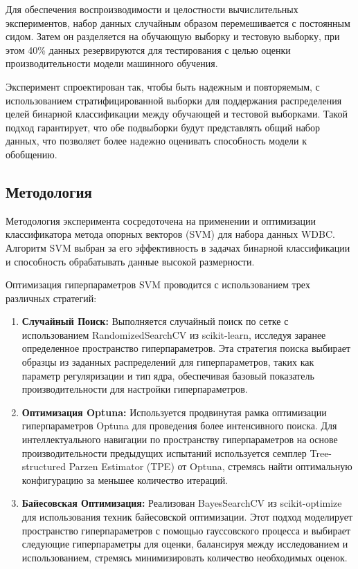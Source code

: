 \documentclass{article}
\begin{document}
Для обеспечения воспроизводимости и целостности вычислительных экспериментов, набор данных случайным образом перемешивается с постоянным сидом. Затем он разделяется на обучающую выборку и тестовую выборку, при этом 40\% данных резервируются для тестирования с целью оценки производительности модели машинного обучения.

Эксперимент спроектирован так, чтобы быть надежным и повторяемым, с использованием стратифицированной выборки для поддержания распределения целей бинарной классификации между обучающей и тестовой выборками. Такой подход гарантирует, что обе подвыборки будут представлять общий набор данных, что позволяет более надежно оценивать способность модели к обобщению.



\subsection{Методология}
Методология эксперимента сосредоточена на применении и оптимизации классификатора метода опорных векторов (SVM) для набора данных WDBC. Алгоритм SVM выбран за его эффективность в задачах бинарной классификации и способность обрабатывать данные высокой размерности.

Оптимизация гиперпараметров SVM проводится с использованием трех различных стратегий:

\begin{enumerate}
\item \textbf{Случайный Поиск:} Выполняется случайный поиск по сетке с использованием RandomizedSearchCV из scikit-learn, исследуя заранее определенное пространство гиперпараметров. Эта стратегия поиска выбирает образцы из заданных распределений для гиперпараметров, таких как параметр регуляризации и тип ядра, обеспечивая базовый показатель производительности для настройки гиперпараметров.

\item \textbf{Оптимизация Optuna:} Используется продвинутая рамка оптимизации гиперпараметров Optuna для проведения более интенсивного поиска. Для интеллектуального навигации по пространству гиперпараметров на основе производительности предыдущих испытаний используется семплер Tree-structured Parzen Estimator (TPE) от Optuna, стремясь найти оптимальную конфигурацию за меньшее количество итераций.

\item \textbf{Байесовская Оптимизация:} Реализован BayesSearchCV из scikit-optimize для использования техник байесовской оптимизации. Этот подход моделирует пространство гиперпараметров с помощью гауссовского процесса и выбирает следующие гиперпараметры для оценки, балансируя между исследованием и использованием, стремясь минимизировать количество необходимых оценок.
\end{enumerate}
\end{document}
